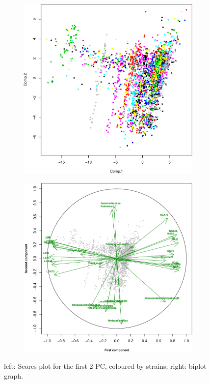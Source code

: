\documentclass[11pt, a4paper,titlepage]{article}
\begin{document}
\begin{figure}[h]
  \begin{subfigure}{.5\textwidth}
    \centering
    \includegraphics[width=1\linewidth]{pca.pdf}
  \end{subfigure}%
  \begin{subfigure}{.5\textwidth}
    \centering
    \includegraphics[width=1\linewidth]{biplot.pdf}
  \end{subfigure}
  \caption{left: Scores plot for the first 2 PC, coloured by strains;
    right: biplot graph.}
  \label{fig:pcplot}
\end{figure}
\end{document}
